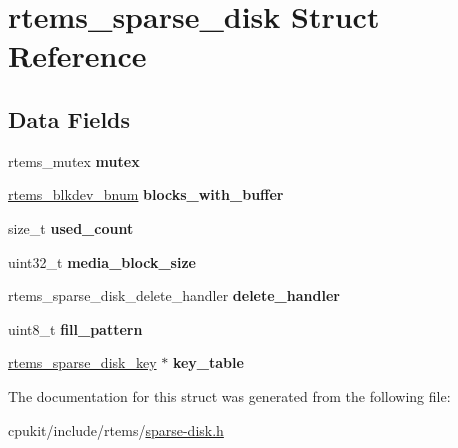 \hypertarget{structrtems__sparse__disk}{}\section{rtems\+\_\+sparse\+\_\+disk Struct Reference}
\label{structrtems__sparse__disk}
\subsection*{Data Fields}
\begin{DoxyCompactItemize}
\item 
\mbox{\label{structrtems__sparse__disk_a81999b07c8d19aee4b4fe067fd518af5}} 
rtems\+\_\+mutex {\bfseries mutex}
\item 
\mbox{\label{structrtems__sparse__disk_ac75ab6960c416964f24a351e09fb07c2}} 
\mbox{\hyperlink{group__rtems__disk_ga5fbcfd40b657bff6c54d9e393fab3274}{rtems\+\_\+blkdev\+\_\+bnum}} {\bfseries blocks\+\_\+with\+\_\+buffer}
\item 
\mbox{\label{structrtems__sparse__disk_afadd928ca8e169adda5ffdbf97109506}} 
size\+\_\+t {\bfseries used\+\_\+count}
\item 
\mbox{\label{structrtems__sparse__disk_ace8a6e37ecfeaa1ffe2b6d805000e38f}} 
uint32\+\_\+t {\bfseries media\+\_\+block\+\_\+size}
\item 
\mbox{\label{structrtems__sparse__disk_a01f064564a3d0a9745cca6c4c4552e15}} 
rtems\+\_\+sparse\+\_\+disk\+\_\+delete\+\_\+handler {\bfseries delete\+\_\+handler}
\item 
\mbox{\label{structrtems__sparse__disk_a26abad060e155a0e1e91179d3841b24f}} 
uint8\+\_\+t {\bfseries fill\+\_\+pattern}
\item 
\mbox{\label{structrtems__sparse__disk_a6dfa9276ab3959a69cafe598fe1ae196}} 
\mbox{\hyperlink{structrtems__sparse__disk__key}{rtems\+\_\+sparse\+\_\+disk\+\_\+key}} $\ast$ {\bfseries key\+\_\+table}
\end{DoxyCompactItemize}


The documentation for this struct was generated from the following file\+:\begin{DoxyCompactItemize}
\item 
cpukit/include/rtems/\mbox{\hyperlink{sparse-disk_8h}{sparse-\/disk.\+h}}\end{DoxyCompactItemize}
